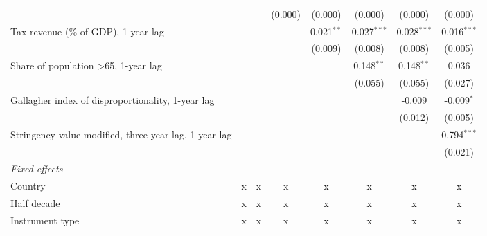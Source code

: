 \begin{tabular}{lccccccc}
                                                                     &               &               & (0.000)       & (0.000)        & (0.000)        & (0.000)        & (0.000)\\   
   Tax revenue (\% of GDP), 1-year lag                               &               &               &               & 0.021$^{**}$   & 0.027$^{***}$  & 0.028$^{***}$  & 0.016$^{***}$\\   
                                                                     &               &               &               & (0.009)        & (0.008)        & (0.008)        & (0.005)\\   
   Share of population >65, 1-year lag                               &               &               &               &                & 0.148$^{**}$   & 0.148$^{**}$   & 0.036\\   
                                                                     &               &               &               &                & (0.055)        & (0.055)        & (0.027)\\   
   Gallagher index of disproportionality, 1-year lag                 &               &               &               &                &                & -0.009         & -0.009$^{*}$\\   
                                                                     &               &               &               &                &                & (0.012)        & (0.005)\\   
   Stringency value modified, three-year lag, 1-year lag             &               &               &               &                &                &                & 0.794$^{***}$\\   
                                                                     &               &               &               &                &                &                & (0.021)\\   
   \emph{Fixed effects}\\
   Country                                                           & x             & x             & x             & x              & x              & x              & x\\  
   Half decade                                                       & x             & x             & x             & x              & x              & x              & x\\  
   Instrument type                                                   & x             & x             & x             & x              & x              & x              & x\\  

\end{tabular}
